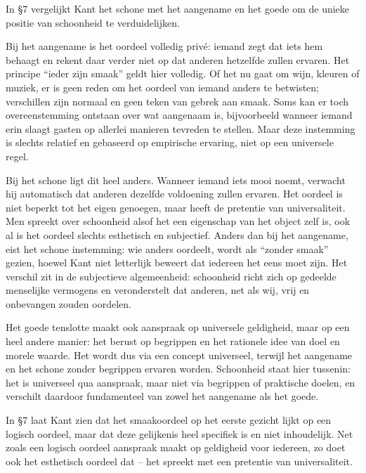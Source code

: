 \begin{mdframed}[leftmargin=0pt,rightmargin=0pt,backgroundcolor=blue!6,linecolor=white,innertopmargin=6pt,innerbottommargin=6pt]
In §7 vergelijkt Kant het schone met het aangename en het goede om de unieke positie van schoonheid te verduidelijken.

Bij het aangename is het oordeel volledig privé: iemand zegt dat iets hem behaagt en rekent daar verder niet op dat anderen hetzelfde zullen ervaren. Het principe “ieder zijn smaak” geldt hier volledig. Of het nu gaat om wijn, kleuren of muziek, er is geen reden om het oordeel van iemand anders te betwisten; verschillen zijn normaal en geen teken van gebrek aan smaak. Soms kan er toch overeenstemming ontstaan over wat aangenaam is, bijvoorbeeld wanneer iemand erin slaagt gasten op allerlei manieren tevreden te stellen. Maar deze instemming is slechts relatief en gebaseerd op empirische ervaring, niet op een universele regel.

Bij het schone ligt dit heel anders. Wanneer iemand iets mooi noemt, verwacht hij automatisch dat anderen dezelfde voldoening zullen ervaren. Het oordeel is niet beperkt tot het eigen genoegen, maar heeft de pretentie van universaliteit. Men spreekt over schoonheid alsof het een eigenschap van het object zelf is, ook al is het oordeel slechts esthetisch en subjectief. Anders dan bij het aangename, eist het schone instemming: wie anders oordeelt, wordt als “zonder smaak” gezien, hoewel Kant niet letterlijk beweert dat iedereen het eens moet zijn. Het verschil zit in de subjectieve algemeenheid: schoonheid richt zich op gedeelde menselijke vermogens en veronderstelt dat anderen, net als wij, vrij en onbevangen zouden oordelen.

Het goede tenslotte maakt ook aanspraak op universele geldigheid, maar op een heel andere manier: het berust op begrippen en het rationele idee van doel en morele waarde. Het wordt dus via een concept universeel, terwijl het aangename en het schone zonder begrippen ervaren worden. Schoonheid staat hier tussenin: het is universeel qua aanspraak, maar niet via begrippen of praktische doelen, en verschilt daardoor fundamenteel van zowel het aangename als het goede.

\bigskip
In §7 laat Kant zien dat het smaakoordeel op het eerste gezicht lijkt op een logisch oordeel, maar dat deze gelijkenis heel specifiek is en niet inhoudelijk. Net zoals een logisch oordeel aanspraak maakt op geldigheid voor iedereen, zo doet ook het esthetisch oordeel dat -- het spreekt met een pretentie van universaliteit.


\end{mdframed}
